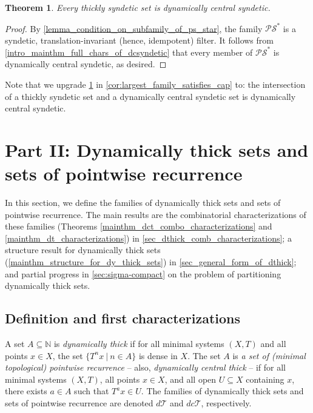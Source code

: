 \documentclass[letter,11pt]{article}
\theoremstyle{plain}
\newtheorem{theorem}{Theorem}
\theoremstyle{definition}
\theoremstyle{plain}
\theoremstyle{plain}
\numberwithin{equation}{section}
\newcommand{\N}{\mathbb{N}}
\newcommand{\dthick}{d\mathcal{T}}
\newcommand{\dcthick}{dc\mathcal{T}}
\newcommand{\PS}{\mathcal{PS}}
\begin{document}
\begin{theorem}
\label{ex_ps_star_is_dcs}
    Every thickly syndetic set is dynamically central syndetic.
\end{theorem}

\begin{proof}
By \cref{lemma_condition_on_subfamily_of_ps_star}, the family $\PS^*$ is a syndetic, translation-invariant (hence, idempotent) filter.  It follows from \cref{intro_mainthm_full_chars_of_dcsyndetic} that every member of $\PS^*$ is dynamically central syndetic, as desired.
\end{proof}

Note that we upgrade \cref{ex_ps_star_is_dcs} in \cref{cor:largest_family_satisfies_cap} to: the intersection of a thickly syndetic set and a dynamically central syndetic set is dynamically central syndetic.




\section{Part II: Dynamically thick sets and sets of pointwise recurrence}
\label{sec_dthick}

In this section, we define the families of dynamically thick sets and sets of pointwise recurrence.  The main results are the combinatorial characterizations of these families (Theorems \ref{mainthm_dct_combo_characterizations} and \ref{mainthm_dt_characterizations}) in \cref{sec_dthick_comb_characterizations}; a  structure result for dynamically thick sets (\cref{mainthm_structure_for_dy_thick_sets}) in \cref{sec_general_form_of_dthick}; and partial progress in \cref{sec:sigma-compact} on the problem of partitioning dynamically thick sets.

\subsection{Definition and first characterizations}
\label{sec_dy_thick_def_and_char}

A set $A \subseteq \N$ is \emph{dynamically thick} if for all minimal systems $(X,T)$ and all points $x \in X$, the set $\{T^n x \ | \ n \in A\}$ is dense in $X$.  The set $A$ is \emph{a set of (minimal topological) pointwise recurrence} -- also, \emph{dynamically central thick} -- if for all minimal systems $(X,T)$, all points $x \in X$, and all open $U \subseteq X$ containing $x$, there exists $a \in A$ such that $T^a x \in U$. The families of dynamically thick sets and sets of pointwise recurrence are denoted $\dthick$ and $\dcthick$, respectively.
\end{document}
